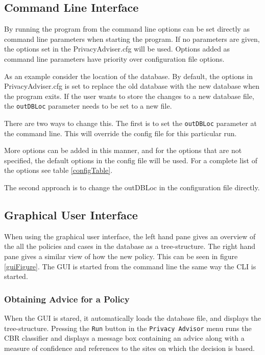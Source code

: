 \subsection{Command Line Interface} \label{cliExplained}
By running the program from the command line options can be set directly as command line parameters when starting the program. If no parameters are given, the options set in the PrivacyAdviser.cfg will be used. Options added as command line parameters have priority over configuration file options.

As an example consider the location of the database. By default, the options in PrivacyAdviser.cfg is set to replace the old database with the new database when the program exits. If the user wants to store the changes to a new database file, the \texttt{outDBLoc} parameter needs to be set to a new file.

There are two ways to change this. The first is to set the \texttt{outDBLoc} parameter at the command line. This will override the config file for this particular run. 


More options can be added in this manner, and for the options that are not specified, the default options in the config file will be used. For a complete list of the options see table \ref{configTable}.

The second approach is to change the outDBLoc in the configuration file directly.

\subsection{Graphical User Interface}
When using the graphical user interface, the left hand pane gives an overview of the all the policies and cases in the database as a tree-structure. The right hand pane gives a similar view of how the new policy. This can be seen in figure \ref{guiFigure}. The GUI is started from the command line the same way the CLI is started.

\subsubsection{Obtaining Advice for a Policy}
When the GUI is stared, it automatically loads the database file, and displays the tree-structure. Pressing the \texttt{Run} button in the \texttt{Privacy Advisor} menu runs the CBR classifier and displays a message box containing an advice along with a measure of confidence and references to the sites on which the decision is based.

